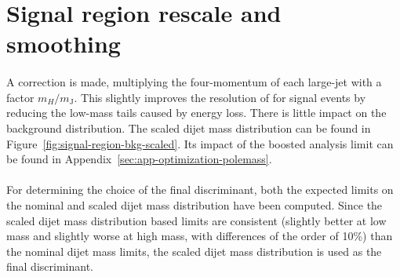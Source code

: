 \section{Signal region rescale and smoothing}
\label{sec:boosted-SR-smoothing}

\paragraph{}
A correction is made, multiplying the four-momentum of each large-\R jet with a factor $m_{H}/m_{\mathrm{J}}$. 
This slightly improves the resolution of \mtwoJ for signal events by reducing the low-mass tails caused by energy loss. 
There is little impact on the background distribution.
The scaled dijet mass distribution can be found in Figure~\ref{fig:signal-region-bkg-scaled}.
Its impact of the boosted analysis limit can be found in Appendix~\ref{sec:app-optimization-polemass}.

\paragraph{}
For determining the choice of the final discriminant, both the expected limits on the nominal and scaled dijet mass distribution have been computed.  
Since the scaled dijet mass distribution based limits are consistent (slightly better at low mass and slightly worse at high mass, with differences of the order of 10\%) than the nominal dijet mass limits, the scaled dijet mass distribution is used as the final discriminant.

